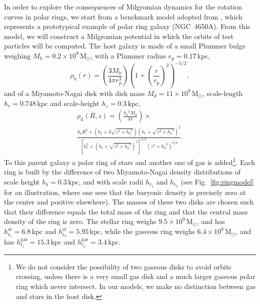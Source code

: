 \documentclass[useAMS,usenatbib]{mn2e}
\newcommand{\Msun}{\ensuremath{\text{M}_\odot}}
\begin{document}
In order to explore the consequences of Milgromian dynamics for the rotation curves in polar rings, we start from a benchmark model adopted from \citet{CombesArnaboldi}, which represents a prototypical example of polar ring galaxy (NGC~4650A). From this model, we will construct a Milgromian potential in which the orbits of test particles will be computed. The host galaxy is made of a small Plummer bulge \citep{plummer} weighing $M_\text{b}=0.2 \times 10^9\,\Msun$, with a Plummer radius $r_\text{p}=0.17\,\text{kpc}$, 
\begin{equation}
\rho_\text{b} (r )= \left( \frac{3 M_\text{b}}{4 \pi r_\text{p}^3} \right) \left( 1 + \left(\frac{r}{r_\text{p}}\right)^2 \right)^{-5/2},
\end{equation}
and of a Miyamoto-Nagai disk \citep{MN} with disk mass $M_d=11 \times 10^{9}\,\Msun$, scale-length $h_r=0.748\,\text{kpc}$ and scale-height $h_z=0.3\,\text{kpc}$,
\begin{equation}
\begin{array}{l}
\rho_\text{d}(R,z)=\left(\frac{{h_\text{z}}^2 M_\text{d}}{4 \pi}\right) \times \\
\frac{h_\text{r} R^2+(h_\text{r}+3\sqrt{z^2+{h_\text{z}}^2})\left(h_\text{r}+\sqrt{z^2+{h_\text{z}}^2}\right)^2 }
{ \left[h_\text{r}^2+\left(h_\text{r}+\sqrt{z^2+{h_\text{z}}^2}\right)^2\right]^{5/2}\left(z^2+{h_\text{z}}^2\right)^{3/2} }.
\end{array}
\end{equation}
To this parent galaxy a polar ring of stars and another one of gas is added\footnote{We do not consider the possibility of two gaseous disks to avoid orbits crossing, unless there is a very small gas disk and a much larger gaseous polar ring which never intersect. In our models, we make no distinction between gas and stars in the host disk.}. Each ring is built by the difference of two Miyamoto-Nagai density distributions of scale height $h_\text{z} = 0.3\,\text{kpc}$, and with scale radii $h_{\text{r}_{1}}$ and $h_{\text{r}_{2}}$ (see Fig.~\ref{fig:ringmodel} for an illustration, where one sees that the baryonic density is precisely zero at the center and positive elsewhere). The masses of these two disks are chosen such that their difference equals the total mass of the ring and that the central mass density of the ring is zero.
The stellar ring weighs $9.5 \times 10^{9}\,\Msun$, and has $h^\text{st}_{\text{r}_{1}} = 6.8\,\text{kpc}$ and $h^\text{st}_{\text{r}_{2}} = 5.95\,\text{kpc}$, while the gaseous ring weighs $6.4 \times 10^{9}\,\Msun$, and has $h^\text{gas}_{\text{r}_{1}} = 15.3\,\text{kpc}$ and $h^\text{gas}_{\text{r}_{2}} = 3.4\,\text{kpc}$.
\end{document}
